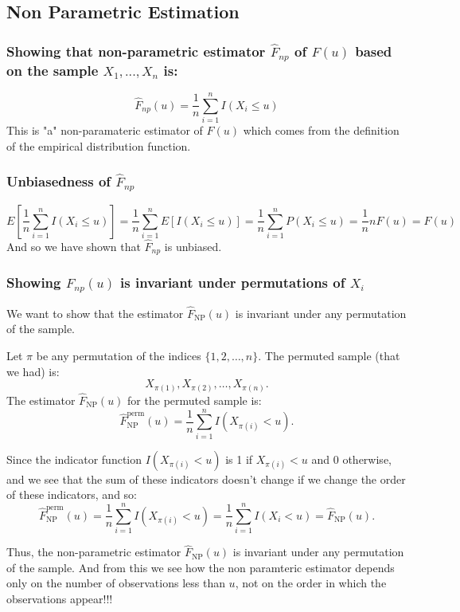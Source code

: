 \documentclass[12pt]{article}
\begin{document}
\subsection*{Non Parametric Estimation}
\subsubsection*{Showing that non-parametric estimator $\hat{F}_{np}$ of $F(u)$ based on the sample $X_1,...,X_n$ is:}
\[
\hat{F}_{np}(u) = \frac{1}{n}\sum_{i=1}^{n}I(X_i \leq u)
\]
This is "a" non-paramateric estimator of $F(u)$ which comes from the definition of the empirical distribution function.\\
\subsubsection*{Unbiasedness of $\hat{F}_{np}$}
\[
E[\frac{1}{n}\sum_{i=1}^{n}I(X_i\leq u)] = \frac{1}{n}\sum_{i=1}^{n}E[I(X_i\leq u)] = \frac{1}{n}\sum_{i=1}^{n}P(X_i\leq u) = \frac{1}{n}nF(u) = F(u)
\]
And so we have shown that $\hat{F}_{np}$ is unbiased.
\subsubsection*{Showing $\hat{F}_{np}(u)$ is invariant under permutations of $X_i$}
We want to show that the estimator $\hat{F}_{\text{NP}}(u)$ is invariant under any permutation of the sample.


Let $\pi$ be any permutation of the indices $\{1, 2, \dots, n\}$. The permuted sample (that we had) is:
\[
X_{\pi(1)}, X_{\pi(2)}, \dots, X_{\pi(n)}.
\]
The estimator $\hat{F}_{\text{NP}}(u)$ for the permuted sample is:
\[
\hat{F}_{\text{NP}}^{\text{perm}}(u) = \frac{1}{n} \sum_{i=1}^{n} I(X_{\pi(i)} < u).
\]

Since the indicator function $I(X_{\pi(i)} < u)$ is 1 if $X_{\pi(i)} < u$ and 0 otherwise, and we see that the sum of these indicators doesn't change if we change the order of these indicators, and so: 
\[
\hat{F}_{\text{NP}}^{\text{perm}}(u) = \frac{1}{n} \sum_{i=1}^{n} I(X_{\pi(i)} < u) = \frac{1}{n} \sum_{i=1}^{n} I(X_i < u) = \hat{F}_{\text{NP}}(u).
\]

Thus, the non-parametric estimator $\hat{F}_{\text{NP}}(u)$ is invariant under any permutation of the sample. And from this we see how the non paramteric estimator depends only on the number of observations less than $u$, not on the order in which the observations appear!!!
\end{document}
